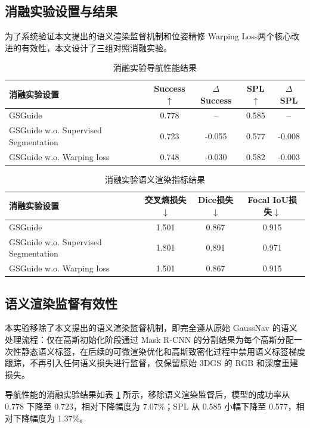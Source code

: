 \subsection{消融实验设置与结果}
为了系统验证本文提出的语义渲染监督机制和位姿精修 Warping Loss两个核心改进的有效性，本文设计了三组对照消融实验。

\begin{table}[htbp]
\centering
\caption{消融实验导航性能结果}
\begin{tabular}{lcccc}
\toprule
消融实验设置 & Success$\uparrow$ & $\Delta$Success & SPL$\uparrow$ & $\Delta$SPL \\
\midrule
GSGuide & 0.778 & -- & 0.585 & -- \\
GSGuide w.o. Supervised Segmentation & 0.723 & -0.055 & 0.577 & -0.008 \\
GSGuide w.o. Warping loss & 0.748 & -0.030 & 0.582 & -0.003 \\
\bottomrule
\end{tabular}
\label{tab:ablation_study}
\end{table}

\begin{table}[htbp]
\centering
\caption{消融实验语义渲染指标结果}
\begin{tabular}{lccc}
\toprule
消融实验设置 & 交叉熵损失$\downarrow$ & Dice损失$\downarrow$ & Focal IoU损失$\downarrow$ \\
\midrule
GSGuide & 1.501 & 0.867 & 0.915 \\
GSGuide w.o. Supervised Segmentation & 1.801 & 0.891 & 0.971 \\
GSGuide w.o. Warping loss & 1.501 & 0.867 & 0.915 \\
\bottomrule
\end{tabular}
\label{tab:ablation_semantic}
\end{table}

\subsection{语义渲染监督有效性}
本实验移除了本文提出的语义渲染监督机制，即完全遵从原始 GaussNav 的语义处理流程：仅在高斯初始化阶段通过 Mask R-CNN 的分割结果为每个高斯分配一次性静态语义标签，在后续的可微渲染优化和高斯致密化过程中禁用语义标签梯度跟踪，不再引入任何语义损失进行监督，仅保留原始 3DGS 的 RGB 和深度重建损失。

导航性能的消融实验结果如表 \ref{tab:ablation_study} 所示，移除语义渲染监督后，模型的成功率从 0.778 下降至 0.723，相对下降幅度为 7.07\%；SPL 从 0.585 小幅下降至 0.577，相对下降幅度为 1.37\%。

